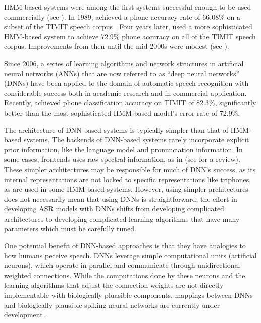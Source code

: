 
HMM-based systems
were among the first systems
successful enough to be
used commercially
(see \citealt{huang2014}).
In 1989, \citet{lee1989}
achieved a phone accuracy rate of
66.08\% on a subset of the
TIMIT speech corpus .
Four years later,
\citet{lamel1993}
used a more sophisticated HMM-based system
to achieve 72.9\% phone accuracy on
all of the TIMIT speech corpus.
Improvements from then until
the mid-2000s were modest
(see \citealt{lopes2011}).

Since 2006, a series of learning algorithms
and network structures in artificial neural networks (ANNs)
that are now referred to as ``deep neural networks'' (DNNs)
have been applied to
the domain of automatic speech recognition
with considerable success
both in academic research
and in commercial application.
Recently, \citet{graves2013}
achieved phone classification accuracy
on TIMIT of 82.3\%,
significantly better than the most sophisticated
HMM-based model's error rate of 72.9\%.

The architecture of DNN-based systems
is typically simpler
than that of HMM-based systems.
The backends of DNN-based systems
rarely incorporate explicit
prior information,
like the language model
and pronunciation information.
In some cases,
frontends uses raw spectral information,
as in \citet{mohamed2012}
(see \citealt{hinton2012}
for a review).
These simpler architectures may be
responsible for much of DNN's success,
as its internal representations
are not locked to specific representations
like triphones,
as are used in some HMM-based systems.
However, using simpler architectures
does not necessarily mean that
using DNNs is straightforward;
the effort in developing ASR models
with DNNs shifts from
developing complicated architectures
to developing complicated learning algorithms
that have many parameters
which must be carefully tuned.

One potential benefit of DNN-based approaches
is that they have analogies to
how humans peceive speech.
DNNs leverage simple computational units
(artificial neurons),
which operate in parallel
and communicate through unidirectional
weighted connections.
While the computations done by these neurons
and the learning algorithms that adjust
the connection weights
are not directly implementable
with biologically pluasible components,
mappings between DNNs
and biologically plausible spiking neural networks
are currently under development
\citep{hunsberger2015}.


